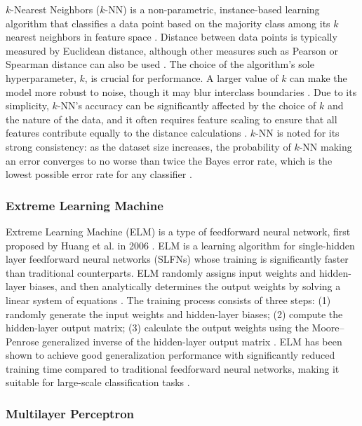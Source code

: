 $k$-Nearest Neighbors ($k$-NN) is a non-parametric, instance-based learning algorithm that classifies a data point based on the majority class among its $k$ nearest neighbors in feature space \cite{Cover1967}. Distance between data points is typically measured by Euclidean distance, although other measures such as Pearson or Spearman distance can also be used \cite{Jaskowiak2011}. The choice of the algorithm's sole hyperparameter, $k$, is crucial for performance. A larger value of $k$ can make the model more robust to noise, though it may blur interclass boundaries \cite{Everitt2011}. Due to its simplicity, $k$-NN's accuracy can be significantly affected by the choice of $k$ and the nature of the data, and it often requires feature scaling to ensure that all features contribute equally to the distance calculations \cite{Nigsch2006}. $k$-NN is noted for its strong consistency: as the dataset size increases, the probability of $k$-NN making an error converges to no worse than twice the Bayes error rate, which is the lowest possible error rate for any classifier \cite{Cover1967}.

\subsubsection{Extreme Learning Machine}

Extreme Learning Machine (ELM) is a type of feedforward neural network, first proposed by Huang et al. in 2006 \cite{Huang2006}. ELM is a learning algorithm for single-hidden layer feedforward neural networks (SLFNs) whose training is significantly faster than traditional counterparts. ELM randomly assigns input weights and hidden-layer biases, and then analytically determines the output weights by solving a linear system of equations \cite{Huang2006}. The training process consists of three steps: (1) randomly generate the input weights and hidden-layer biases; (2) compute the hidden-layer output matrix; (3) calculate the output weights using the Moore--Penrose generalized inverse of the hidden-layer output matrix \cite{Huang2006}. ELM has been shown to achieve good generalization performance with significantly reduced training time compared to traditional feedforward neural networks, making it suitable for large-scale classification tasks \cite{Huang2012}.

\subsubsection{Multilayer Perceptron}

